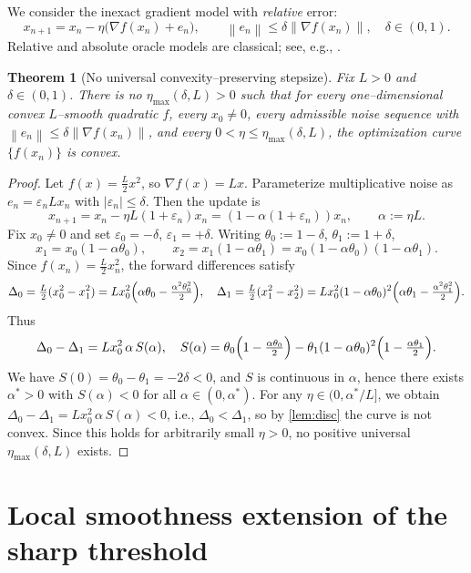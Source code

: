 \documentclass[11pt]{article}
\theoremstyle{plain}
\newtheorem{theorem}{Theorem}[section]
\theoremstyle{remark}
\newcommand{\norm}[1]{\left\lVert #1\right\rVert}
\begin{document}
We consider the inexact gradient model with \emph{relative} error:
\begin{equation}\label{eq:inexact}
x_{n+1}=x_n-\eta\bigl(\nabla f(x_n)+e_n\bigr),\qquad \norm{e_n}\le \delta \norm{\nabla f(x_n)},\quad \delta\in(0,1).
\end{equation}
Relative and absolute oracle models are classical; see, e.g., \cite{DevolderGlineurNesterov2014,DaspremontJaggi2013}.

\begin{theorem}[No universal convexity--preserving stepsize]\label{thm:imposs}
Fix $L>0$ and $\delta\in(0,1)$. There is \emph{no} $\eta_{\max}(\delta,L)>0$ such that for every one--dimensional convex $L$--smooth quadratic $f$, every $x_0\ne0$, every admissible noise sequence with $\norm{e_n}\le\delta\norm{\nabla f(x_n)}$, and every $0<\eta\le \eta_{\max}(\delta,L)$, the optimization curve $\{f(x_n)\}$ is convex.
\end{theorem}

\begin{proof}
Let $f(x)=\tfrac{L}{2}x^2$, so $\nabla f(x)=Lx$. Parameterize multiplicative noise as $e_n=\varepsilon_n Lx_n$ with $|\varepsilon_n|\le \delta$. Then the update is
\[
x_{n+1}=x_n-\eta L(1+\varepsilon_n)x_n=(1-\alpha(1+\varepsilon_n))x_n,\qquad \alpha:=\eta L.
\]
Fix $x_0\ne0$ and set $\varepsilon_0=-\delta$, $\varepsilon_1=+\delta$. Writing $\theta_0:=1-\delta$, $\theta_1:=1+\delta$,
\[
x_1=x_0(1-\alpha\theta_0),\qquad x_2=x_1(1-\alpha\theta_1)=x_0(1-\alpha\theta_0)(1-\alpha\theta_1).
\]
Since $f(x_n)=\tfrac{L}{2}x_n^2$, the forward differences satisfy
\[
\Delta_0=\tfrac{L}{2}(x_0^2-x_1^2)=Lx_0^2\Bigl(\alpha\theta_0-\tfrac{\alpha^2\theta_0^2}{2}\Bigr),\quad
\Delta_1=\tfrac{L}{2}(x_1^2-x_2^2)=Lx_0^2(1-\alpha\theta_0)^2\Bigl(\alpha\theta_1-\tfrac{\alpha^2\theta_1^2}{2}\Bigr).
\]
Thus
\[
\Delta_0-\Delta_1=Lx_0^2\,\alpha\,S(\alpha),
\quad
S(\alpha)=\theta_0\Bigl(1-\tfrac{\alpha\theta_0}{2}\Bigr)-\theta_1(1-\alpha\theta_0)^2\Bigl(1-\tfrac{\alpha\theta_1}{2}\Bigr).
\]
We have $S(0)=\theta_0-\theta_1=-2\delta<0$, and $S$ is continuous in $\alpha$, hence there exists $\alpha^\ast>0$ with $S(\alpha)<0$ for all $\alpha\in(0,\alpha^\ast)$. For any $\eta\in(0,\alpha^\ast/L]$, we obtain $\Delta_0-\Delta_1=Lx_0^2\,\alpha\,S(\alpha)<0$, i.e., $\Delta_0<\Delta_1$, so by \cref{lem:disc} the curve is not convex. Since this holds for arbitrarily small $\eta>0$, no positive universal $\eta_{\max}(\delta,L)$ exists.
\end{proof}

\section{Local smoothness extension of the sharp threshold}
\end{document}
